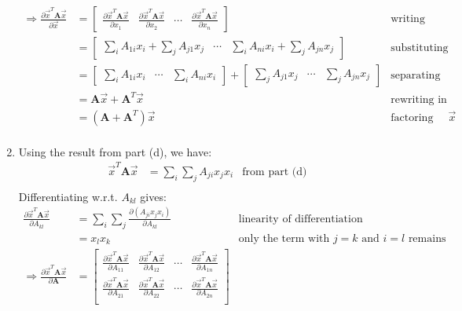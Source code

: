 \documentclass[11pt]{article}
\newcommand{\pd}[2]{\frac{\partial #1}{\partial #2}}
\begin{document}
\begin{enumerate}
\begin{align*}
        \Rightarrow \pd{\vec{x}^T \textbf{A} \vec{x}}{\vec{x}} &= \begin{bmatrix}
            \pd{\vec{x}^T \textbf{A} \vec{x}}{x_1} & \pd{\vec{x}^T \textbf{A} \vec{x}}{x_2} & \cdots & \pd{\vec{x}^T \textbf{A} \vec{x}}{x_n}
        \end{bmatrix} & \text{writing derivative in vector form} \\
        &= \begin{bmatrix}
            \sum_{i} A_{1i} x_i + \sum_{j} A_{j1} x_j & \cdots & \sum_{i} A_{ni} x_i + \sum_{j} A_{jn} x_j
        \end{bmatrix} & \text{substituting previous result} \\
        &= \begin{bmatrix}
            \sum_{i} A_{1i} x_i & \cdots & \sum_{i} A_{ni} x_i
        \end{bmatrix} + \begin{bmatrix}
            \sum_{j} A_{j1} x_j & \cdots & \sum_{j} A_{jn} x_j
        \end{bmatrix} & \text{separating the sums} \\
        &= \textbf{A} \vec{x} + \textbf{A}^T \vec{x} & \text{rewriting in matrix form} \\
        &= (\textbf{A} + \textbf{A}^T) \vec{x} & \text{factoring out } \vec{x} \\
    \end{align*}
    \item Using the result from part (d), we have:
    \begin{align*}
        \vec{x}^T \textbf{A} \vec{x} &= \sum_{i} \sum_{j} A_{ji} x_j x_i & \text{from part (d)} \\
    \end{align*}
    Differentiating w.r.t. $A_{kl}$ gives:
    \begin{align*}
        \pd{\vec{x}^T \textbf{A} \vec{x}}{A_{kl}} &= \sum_{i} \sum_{j} \pd{(A_{ji} x_j x_i)}{A_{kl}} & \text{linearity of differentiation} \\
        &= x_l x_k & \text{only the term with } j = k \text{ and } i = l \text{ remains} \\
        \Rightarrow \pd{\vec{x}^T \textbf{A} \vec{x}}{\textbf{A}} &= \begin{bmatrix}
            \pd{\vec{x}^T \textbf{A} \vec{x}}{A_{11}} & \pd{\vec{x}^T \textbf{A} \vec{x}}{A_{12}} & \cdots & \pd{\vec{x}^T \textbf{A} \vec{x}}{A_{1n}} \\
            \pd{\vec{x}^T \textbf{A} \vec{x}}{A_{21}} & \pd{\vec{x}^T \textbf{A} \vec{x}}{A_{22}} & \cdots & \pd{\vec{x}^T \textbf{A} \vec{x}}{A_{2n}} \\

\end{bmatrix}
\end{align*}
\end{enumerate}
\end{document}
